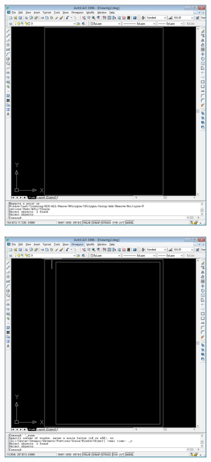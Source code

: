 \documentclass[
	a4paper,
	oneside,
	BCOR = 10mm,
	DIV = 12,
	12pt,
	headings = normal,
]{scrartcl}
\begin{document}
			\begin{figure}[!htbp]
				\begin{subfigure}[b]{0.5\columnwidth}
					\centering
					\includegraphics[height=13\baselineskip]{./assets/y04s01-csdt-lab-01-01-p01.png}
					\caption{}
					\label{subfig:01-borders-01}
				\end{subfigure}%
				\begin{subfigure}[b]{0.5\columnwidth}
					\centering
					\includegraphics[height=13\baselineskip]{./assets/y04s01-csdt-lab-01-01-p02.png}

\end{subfigure}
\end{figure}
\end{document}
